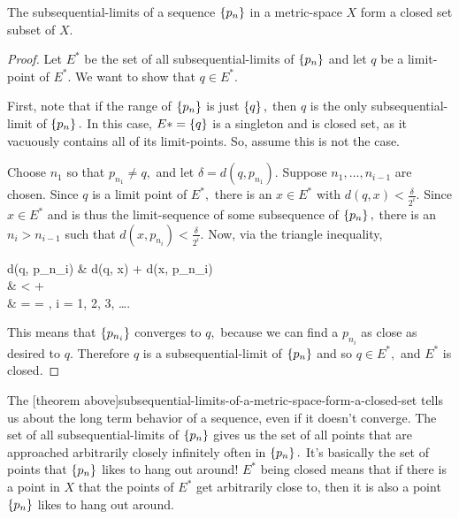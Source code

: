\documentclass{article}
\begin{document}
\begin{theorem}\label{subsequential-limits-of-a-metric-space-form-a-closed-set}
The \@{subsequential-limits} of a \@{sequence} $\left\{ p_n \right\}$ in a \@{metric-space} $X$ form a \@{closed} \@{set} \@{subset} of $X.$
\end{theorem}

\begin{proof}
Let $E^*$ be the \@{set} of all \@{subsequential-limits} of $\left\{ p_n \right\}$ and let $q$ be a \@{limit-point} of $E^*.$ We want to show that $q \in E^*.$

First, note that if the range of $\left\{ p_n \right\}$ is just $\left\{ q \right\},$ then $q$ is the only \@{subsequential-limit} of $\left\{ p_n \right\}.$ In this case, $E* = \left\{ q \right\}$ is a singleton and is \@{closed} \@{set}, as it vacuously contains all of its \@{limit-points}. So, assume this is not the case.

Choose $n_1$ so that $p_{n_1} \neq q,$ and let $\delta = d(q, p_{n_1}).$ Suppose $n_1, \dots, n_{i-1}$ are chosen. Since $q$ is a limit point of $E^*,$ there is an $x \in E^*$ with $d(q, x) < \frac{\delta}{2^i}.$ Since $x \in E^*$ and is thus the \@{limit-sequence} of some \@{subsequence} of $\left\{ p_n \right\},$ there is an $n_i > n_{i-1}$ such that $d(x, p_{n_i}) < \frac{\delta}{2^i}.$ Now, via the triangle inequality,

\bal d(q, p_{n_i}) & \leq d(q, x) + d(x, p_{n_i}) \\
                                 & <  +  \\
                                 & =  = , \quad i = 1, 2, 3, \dots.
\eal

This means that $\left\{ p_{n_i} \right\}$ \@{converges} to $q,$ because we can find a $p_{n_i}$ as close as desired to $q.$ Therefore $q$ is a \@{subsequential-limit} of $\left\{ p_n \right\}$ and so $q \in E^*,$ and $E^*$ is \@{closed}.
\end{proof}

\detach

\begin{note}
The \@[theorem above]{subsequential-limits-of-a-metric-space-form-a-closed-set} tells us about the long term behavior of a \@{sequence}, even if it doesn't \@{converge}. The \@{set} of all \@{subsequential-limits} of $\left\{ p_n \right\}$ gives us the set of all points that are approached arbitrarily closely infinitely often in $\left\{ p_n \right\}.$ It's basically the set of points that $\left\{ p_n \right\}$ likes to hang out around! $E^*$ being \@{closed} means that if there is a point in $X$ that the points of $E^*$ get arbitrarily close to, then it is also a point $\left\{ p_n \right\}$ likes to hang out around.
\end{note}
\end{document}
